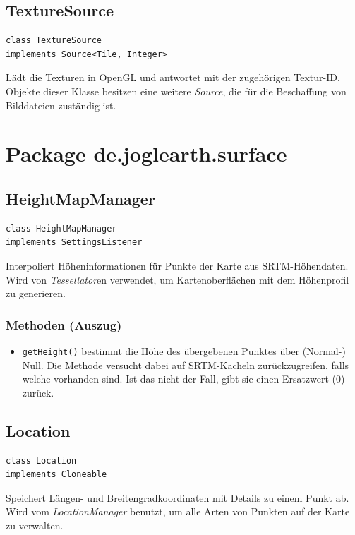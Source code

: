 \documentclass[10pt]{scrreprt}
\begin{document}
\vspace{5mm}
\subsection*{TextureSource}
\begin{lstlisting}
class TextureSource
implements Source<Tile, Integer>
\end{lstlisting}
Lädt die Texturen in OpenGL und antwortet mit der zugehörigen Textur-ID. Objekte dieser Klasse besitzen eine weitere \textit{Source}, die für die Beschaffung von Bilddateien zuständig ist. \\



\vspace{5mm}
\section{Package de.joglearth.surface}
\subsection*{HeightMapManager}
\begin{lstlisting}
class HeightMapManager
implements SettingsListener
\end{lstlisting}
Interpoliert Höheninformationen für Punkte der Karte aus SRTM-Höhendaten. Wird von \textit{Tessellator}en verwendet, um Kartenoberflächen mit dem Höhenprofil zu generieren.\\
\subsubsection*{Methoden (Auszug)}
\begin{itemize}
\item\texttt{getHeight()} bestimmt die Höhe des übergebenen Punktes über (Normal-) Null. Die Methode versucht dabei auf SRTM-Kacheln zurückzugreifen, falls welche vorhanden sind. Ist das nicht der Fall, gibt sie einen Ersatzwert (0) zurück.
\end{itemize}

\vspace{5mm}
\subsection*{Location}
\begin{lstlisting}
class Location
implements Cloneable
\end{lstlisting}
Speichert Längen- und Breitengradkoordinaten mit Details zu einem Punkt ab. Wird vom \textit{LocationManager} benutzt, um alle Arten von Punkten auf der Karte zu verwalten.\\
\end{document}
